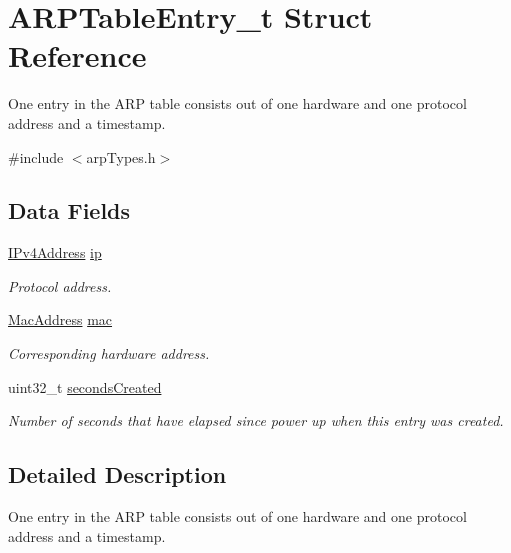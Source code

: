 \hypertarget{struct_a_r_p_table_entry__t}{}\section{A\+R\+P\+Table\+Entry\+\_\+t Struct Reference}
\label{struct_a_r_p_table_entry__t}


One entry in the A\+RP table consists out of one hardware and one protocol address and a timestamp.  




{\ttfamily \#include $<$arp\+Types.\+h$>$}

\subsection*{Data Fields}
\begin{DoxyCompactItemize}
\item 
\mbox{\hyperlink{group__ipv4_gaea6452a06c6a1edb025bdd2a70fef14c}{I\+Pv4\+Address}} \mbox{\hyperlink{struct_a_r_p_table_entry__t_a9eb6364cfba6d26a96b3caa542fd9ed9}{ip}}
\begin{DoxyCompactList}\small\item\em Protocol address. \end{DoxyCompactList}\item 
\mbox{\hyperlink{ethernet_types_8h_ae4e06476597d217d540a5e2b2d699649}{Mac\+Address}} \mbox{\hyperlink{struct_a_r_p_table_entry__t_a2d3bb97c3d100ba11c2257680d849879}{mac}}
\begin{DoxyCompactList}\small\item\em Corresponding hardware address. \end{DoxyCompactList}\item 
uint32\+\_\+t \mbox{\hyperlink{struct_a_r_p_table_entry__t_a06c3d88e59b26905ae3d434ff0b6e23e}{seconds\+Created}}
\begin{DoxyCompactList}\small\item\em Number of seconds that have elapsed since power up when this entry was created. \end{DoxyCompactList}\end{DoxyCompactItemize}


\subsection{Detailed Description}
One entry in the A\+RP table consists out of one hardware and one protocol address and a timestamp. 

